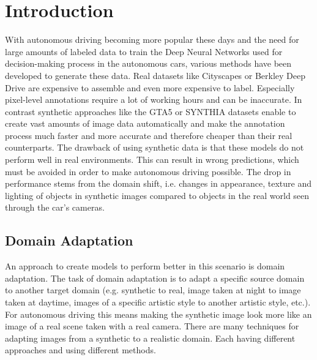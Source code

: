 \chapter{Introduction}
\label{sec:introduction}
With autonomous driving becoming more popular these days and the need for large amounts of labeled data to train the Deep Neural Networks used for decision-making process in the autonomous cars, various methods have been developed to generate these data. Real datasets like Cityscapes \cite{Cordts_2016_CVPR} or Berkley Deep Drive \cite{DBLP:journals/corr/abs-1805-04687} are expensive to assemble and even more expensive to label. Especially pixel-level annotations require a lot of working hours and can be inaccurate. In contrast synthetic approaches like the GTA5 \cite{Richter_2016_ECCV} or SYNTHIA \cite{RosCVPR16} datasets enable to create vast amounts of image data automatically and make the annotation process much faster and more accurate and therefore cheaper than their real counterparts. The drawback of using synthetic data is that these models do not perform well in real environments. This can result in wrong predictions, which must be avoided in order to make autonomous driving possible. The drop in performance stems from the domain shift, i.e. changes in appearance, texture and lighting of objects in synthetic images compared to objects in the real world seen through the car's cameras.

\section{Domain Adaptation}
An approach to create models to perform better in this scenario is domain adaptation. The task of domain adaptation is to adapt a specific source domain to another target domain (e.g. synthetic to real, image taken at night to image taken at daytime, images of a specific artistic style to another artistic style, etc.). For autonomous driving this means making the synthetic image look more like an image of a real scene taken with a real camera. There are many techniques for adapting images from a synthetic to a realistic domain. Each having different approaches and using different methods. 


